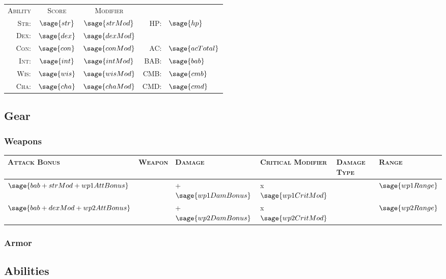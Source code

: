 \documentclass[10pt]{article}
\begin{document}
	\begin{tabular}{r c c | r l}
		\textsc{Ability} & \textsc{Score} & \textsc{Modifier} && \\
		\textsc{Str:} & \(\sage{str}\) & \(\sage{strMod}\) & HP: & \(\sage{hp}\) \\
		\textsc{Dex:} & \(\sage{dex}\) & \(\sage{dexMod}\) \\
		\textsc{Con:} & \(\sage{con}\) & \(\sage{conMod}\) & AC: & \(\sage{acTotal}\) \\
		\textsc{Int:} & \(\sage{int}\) & \(\sage{intMod}\) & BAB: & \(\sage{bab}\) \\
		\textsc{Wis:} & \(\sage{wis}\) & \(\sage{wisMod}\) & CMB: & \(\sage{cmb}\) \\
		\textsc{Cha:} & \(\sage{cha}\) & \(\sage{chaMod}\) & CMD: & \(\sage{cmd}\) \\
	\end{tabular}

\subsection*{Gear}
	\subsubsection*{Weapons}
		\begin{tabularx}{\textwidth}{| X | X | X | X | X | X |}
			\hline
			\textsc{Attack Bonus} & \textsc{Weapon} & \textsc{Damage} & \textsc{Critical Modifier} & \textsc{Damage Type} & \textsc{Range} \\ 
			\hline
			\(\sage{bab+strMod+wp1AttBonus}\) & \wpOneName & \wpOneDam+\(\sage{wp1DamBonus}\) & x\(\sage{wp1CritMod}\)  & \wpOneType & \(\sage{wp1Range}\) \\
			\hline
			\(\sage{bab+dexMod+wp2AttBonus}\) & \wpTwoName & \wpTwoDam+\(\sage{wp2DamBonus}\) & x\(\sage{wp2CritMod}\) & \wpTwoType & \(\sage{wp2Range}\) \\
			\hline
		\end{tabularx}
	\subsubsection*{Armor}


\subsection*{Abilities}
\end{document}
